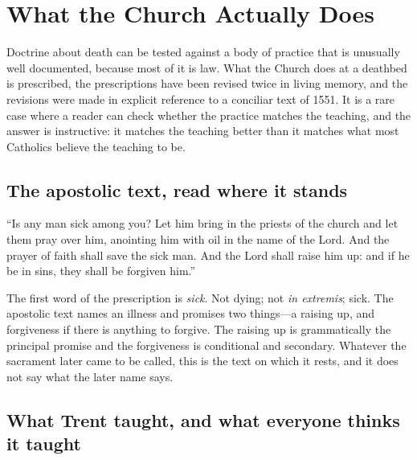 \section{What the Church Actually Does}

Doctrine about death can be tested against a body of practice that is unusually well documented, because most of it is law. What the Church does at a deathbed is prescribed, the prescriptions have been revised twice in living memory, and the revisions were made in explicit reference to a conciliar text of 1551. It is a rare case where a reader can check whether the practice matches the teaching, and the answer is instructive: it matches the teaching better than it matches what most Catholics believe the teaching to be.

\subsection{The apostolic text, read where it stands}

``Is any man sick among you? Let him bring in the priests of the church and let them pray over him, anointing him with oil in the name of the Lord. And the prayer of faith shall save the sick man. And the Lord shall raise him up: and if he be in sins, they shall be forgiven him.''

The first word of the prescription is \emph{sick}. Not dying; not \emph{in extremis}; sick. The apostolic text names an illness and promises two things---a raising up, and forgiveness if there is anything to forgive. The raising up is grammatically the principal promise and the forgiveness is conditional and secondary. Whatever the sacrament later came to be called, this is the text on which it rests, and it does not say what the later name says.

\subsection{What Trent taught, and what everyone thinks it taught}

